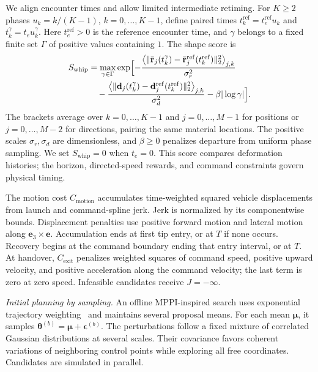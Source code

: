 \documentclass[letterpaper, 10 pt, conference]{ieeeconf}
\begin{document}
We align encounter times and allow limited intermediate retiming.
For $K\geq2$ phases $u_k=k/(K-1)$, $k=0,\ldots,K-1$,
define paired times $t_k^{\mathrm{ref}}=t_e^{\mathrm{ref}}u_k$
and $t_k^\gamma=t_eu_k^\gamma$. Here $t_e^{\mathrm{ref}}>0$ is the
reference encounter time, and $\gamma$ belongs to a fixed finite
set $\Gamma$ of positive values containing $1$.
The shape score is
\begin{equation}
\begin{aligned}
S_{\mathrm{whip}}&=\max_{\gamma\in\Gamma}\exp\Bigl[
-\frac{\bigl\langle\|\bar{\mathbf r}_j(t_k^\gamma)
-\bar{\mathbf r}_j^{\mathrm{ref}}(t_k^{\mathrm{ref}})\|_2^2\bigr\rangle_{j,k}}{\sigma_r^2}\\
&\quad-\frac{\bigl\langle\|\mathbf d_j(t_k^\gamma)
-\mathbf d_j^{\mathrm{ref}}(t_k^{\mathrm{ref}})\|_2^2\bigr\rangle_{j,k}}{\sigma_d^2}
-\beta|\log\gamma|\Bigr].
\end{aligned}
\label{eq:whip_similarity}
\end{equation}
The brackets average over $k=0,\ldots,K-1$ and
$j=0,\ldots,M-1$ for positions or $j=0,\ldots,M-2$ for
directions, pairing the same material locations. The positive
scales $\sigma_r,\sigma_d$ are dimensionless, and $\beta\geq0$
penalizes departure from uniform phase sampling. We set
$S_{\mathrm{whip}}=0$ when $t_e=0$.
This score compares deformation histories; the horizon,
directed-speed rewards, and command constraints govern physical timing.

The motion cost $C_{\mathrm{motion}}$ accumulates time-weighted
squared vehicle displacements from launch and command-spline jerk.
Jerk is normalized by its componentwise bounds. Displacement penalties use
positive forward motion and lateral motion along
$\mathbf e_3\times\mathbf e$. Accumulation ends at first tip
entry, or at $T$ if none occurs. Recovery begins at the command
boundary ending that entry interval, or at $T$.
At handover, $C_{\mathrm{exit}}$ penalizes weighted squares of
command speed, positive upward velocity, and positive acceleration
along the command velocity; the last term is zero at zero speed.
Infeasible candidates receive $J=-\infty$.

\noindent\emph{Initial planning by sampling.}
An offline MPPI-inspired search uses exponential trajectory
weighting~\cite{williams2017model} and maintains several proposal
means. For each mean $\boldsymbol\mu$, it samples
$\boldsymbol\theta^{(b)}=\boldsymbol\mu+\boldsymbol\epsilon^{(b)}$.
The perturbations follow a fixed mixture of correlated Gaussian
distributions at several scales. Their covariance favors coherent
variations of neighboring control points while exploring all
free coordinates. Candidates are simulated in parallel.
\end{document}
